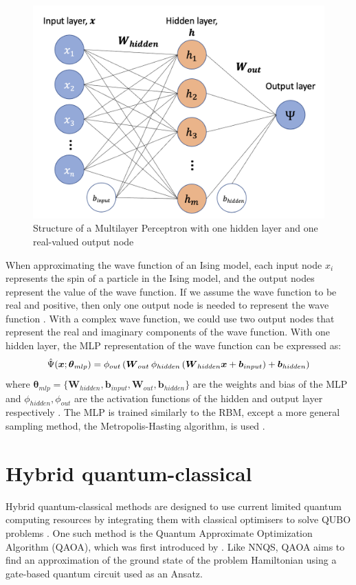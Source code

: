 \begin{figure}[htb!]
    \centering
    \includegraphics[width=0.6\linewidth]{images/mlp_diagram.png}
    \caption{Structure of a Multilayer Perceptron with one hidden layer and one real-valued output node}
    \label{rbmstructure}
\end{figure}
When approximating the wave function of an Ising model, each input node $x_i$ represents the spin of a particle in the Ising model, and the output nodes represent the value of the wave function. If we assume the wave function to be real and positive, then only one output node is needed to represent the wave function \cite{b20}. With a complex wave function, we could use two output nodes that represent the real and imaginary components of the wave function. With one hidden layer, the MLP representation of the wave function can be expressed as:
\begin{equation}
    \Hat{\Psi}(\boldsymbol{x}; \boldsymbol{\theta}_{mlp}) = 
    \phi_{out} \left(
    \boldsymbol{W}_{out} \hspace{2pt}
    \phi_{hidden} \left( \boldsymbol{W}_{hidden}\boldsymbol{x} + \boldsymbol{b}_{input} \right) + \boldsymbol{b}_{hidden} \right)
\end{equation}
where  $\boldsymbol{\theta}_{mlp} = \{\boldsymbol{W}_{hidden}, \boldsymbol{b}_{input}, \boldsymbol{W}_{out}, \boldsymbol{b}_{hidden}\}$ are the weights and bias of the MLP and $\phi_{hidden}, \phi_{out}$ are the activation functions of the hidden and output layer respectively \cite{b20}. The MLP is trained similarly to the RBM, except a more general sampling method, the Metropolis-Hasting algorithm, is used \cite{b25}.

\section{Hybrid quantum-classical}
Hybrid quantum-classical methods are designed to use current limited quantum computing resources by integrating them with classical optimisers to solve QUBO problems \cite{b32}. One such method is the Quantum Approximate Optimization Algorithm (QAOA), which was first introduced by . Like NNQS, QAOA aims to find an approximation of the ground state of the problem Hamiltonian using a gate-based quantum circuit used as an Ansatz.

